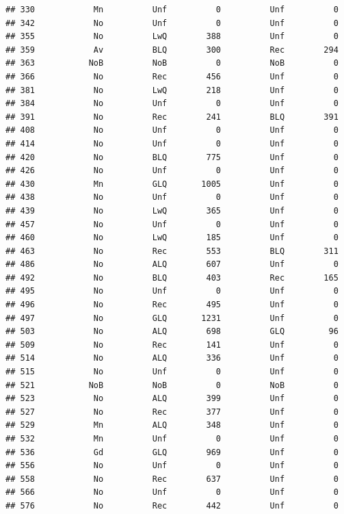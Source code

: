 \documentclass[]{article}
\begin{document}
\begin{verbatim}
## 330            Mn          Unf          0          Unf          0
## 342            No          Unf          0          Unf          0
## 355            No          LwQ        388          Unf          0
## 359            Av          BLQ        300          Rec        294
## 363           NoB          NoB          0          NoB          0
## 366            No          Rec        456          Unf          0
## 381            No          LwQ        218          Unf          0
## 384            No          Unf          0          Unf          0
## 391            No          Rec        241          BLQ        391
## 408            No          Unf          0          Unf          0
## 414            No          Unf          0          Unf          0
## 420            No          BLQ        775          Unf          0
## 426            No          Unf          0          Unf          0
## 430            Mn          GLQ       1005          Unf          0
## 438            No          Unf          0          Unf          0
## 439            No          LwQ        365          Unf          0
## 457            No          Unf          0          Unf          0
## 460            No          LwQ        185          Unf          0
## 463            No          Rec        553          BLQ        311
## 486            No          ALQ        607          Unf          0
## 492            No          BLQ        403          Rec        165
## 495            No          Unf          0          Unf          0
## 496            No          Rec        495          Unf          0
## 497            No          GLQ       1231          Unf          0
## 503            No          ALQ        698          GLQ         96
## 509            No          Rec        141          Unf          0
## 514            No          ALQ        336          Unf          0
## 515            No          Unf          0          Unf          0
## 521           NoB          NoB          0          NoB          0
## 523            No          ALQ        399          Unf          0
## 527            No          Rec        377          Unf          0
## 529            Mn          ALQ        348          Unf          0
## 532            Mn          Unf          0          Unf          0
## 536            Gd          GLQ        969          Unf          0
## 556            No          Unf          0          Unf          0
## 558            No          Rec        637          Unf          0
## 566            No          Unf          0          Unf          0
## 576            No          Rec        442          Unf          0

\end{verbatim}
\end{document}
